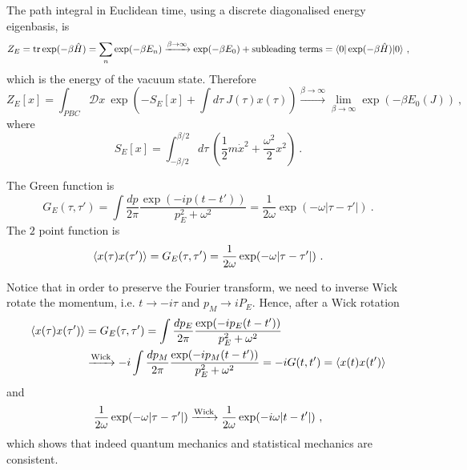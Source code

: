     The path integral in Euclidean time, using a discrete diagonalised energy eigenbasis, is
    \begin{equation*}
        Z_E = \operatorname{tr} \exp(- \beta \hat H) = \sum_n \exp(- \beta E_n) \xrightarrow{\beta \rightarrow \infty} \exp(- \beta E_0) + \textnormal{subleading terms} = \langle0\vert \exp(-\beta \hat H) \vert0\rangle ~,
    \end{equation*}
    which is the energy of the vacuum state. Therefore 
    \begin{equation*}
        Z_E [x] = \int_{PBC} \mathcal D x ~ \exp(- S_E[x] + \int d\tau ~ J(\tau) x(\tau)) \xrightarrow{\beta \rightarrow \infty} \lim_{\beta \rightarrow \infty} \exp(- \beta E_0 (J)) ~,
    \end{equation*}
    where 
    \begin{equation*}
        S_E[x] = \int_{-\beta/2}^{\beta/2} d\tau ~ ( \frac{1}{2} m \dot x^2 + \frac{\omega^2}{2} x^2)~.
    \end{equation*}

    The Green function is 
    \begin{equation*}
        G_E (\tau, \tau') = \int \frac{dp}{2\pi} \frac{\exp(- i p (t - t'))}{p_E^2 + \omega^2} = \frac{1}{2\omega} \exp(- \omega |\tau - \tau'|) ~.
    \end{equation*}
    The $2$ point function is 
    \begin{equation*}
        \langle x(\tau) x(\tau')\rangle = G_E(\tau, \tau') = \frac{1}{2\omega} \exp(- \omega |\tau - \tau'|) ~.
    \end{equation*}

    Notice that in order to preserve the Fourier transform, we need to inverse Wick rotate the momentum, i.e. $t \rightarrow - i \tau$ and $p_M \rightarrow i P_E$. Hence, after a Wick rotation 
    \begin{equation*}
    \begin{aligned}
        \langle x(\tau) x(\tau')\rangle & = G_E(\tau, \tau') = \int \frac{dp_E}{2\pi} \frac{\exp(- i p_E (t - t'))}{p_E^2 + \omega^2} \\ & \xrightarrow{\textnormal{Wick}} - i \int \frac{dp_M}{2\pi} \frac{\exp(- i p_M (t - t'))}{p_E^2 + \omega^2} = - i G(t,t') = \langle x(t) x(t')\rangle
    \end{aligned}
    \end{equation*}
    and 
    \begin{equation*}
        \frac{1}{2\omega} \exp(- \omega |\tau - \tau'|) \xrightarrow{\textnormal{Wick}} \frac{1}{2\omega} \exp(- i \omega |t - t'|) ~,
    \end{equation*}
    which shows that indeed quantum mechanics and statistical mechanics are consistent.

